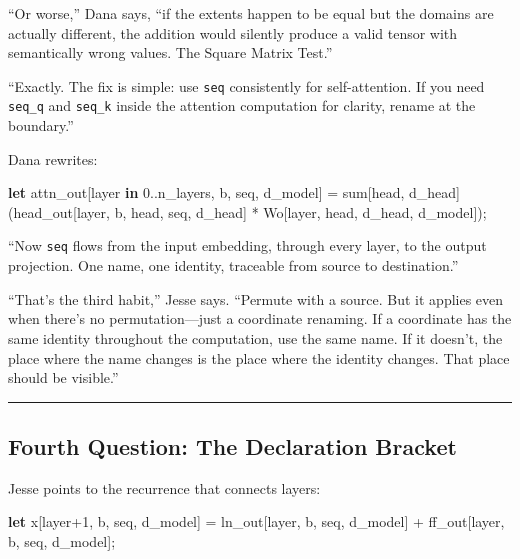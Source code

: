 \documentclass[11pt,]{article}
\newenvironment{Shaded}{}{}
\newcommand{\DecValTok}[1]{\textcolor[rgb]{0.25,0.63,0.44}{#1}}
\newcommand{\KeywordTok}[1]{\textcolor[rgb]{0.00,0.44,0.13}{\textbf{#1}}}
\newcommand{\NormalTok}[1]{#1}
\newcommand{\OperatorTok}[1]{\textcolor[rgb]{0.40,0.40,0.40}{#1}}
\begin{document}
``Or worse,'' Dana says, ``if the extents happen to be equal but the
domains are actually different, the addition would silently produce a
valid tensor with semantically wrong values. The Square Matrix Test.''

``Exactly. The fix is simple: use \texttt{seq} consistently for
self-attention. If you need \texttt{seq\_q} and \texttt{seq\_k} inside
the attention computation for clarity, rename at the boundary.''

Dana rewrites:

\begin{Shaded}
\begin{Highlighting}[]
\KeywordTok{let}\NormalTok{ attn_out}\OperatorTok{[}\NormalTok{layer }\KeywordTok{in} \DecValTok{0.}\NormalTok{.n_layers, b, seq, d_model}\OperatorTok{]}\NormalTok{ =}
\NormalTok{    sum}\OperatorTok{[}\NormalTok{head, d_head}\OperatorTok{]}\NormalTok{(head_out}\OperatorTok{[}\NormalTok{layer, b, head, seq, d_head}\OperatorTok{]}\NormalTok{ *}
\NormalTok{                       Wo}\OperatorTok{[}\NormalTok{layer, head, d_head, d_model}\OperatorTok{]}\NormalTok{);}
\end{Highlighting}
\end{Shaded}

``Now \texttt{seq} flows from the input embedding, through every layer,
to the output projection. One name, one identity, traceable from source
to destination.''

``That's the third habit,'' Jesse says. ``Permute with a source. But it
applies even when there's no permutation---just a coordinate renaming.
If a coordinate has the same identity throughout the computation, use
the same name. If it doesn't, the place where the name changes is the
place where the identity changes. That place should be visible.''

\begin{center}\rule{0.5\linewidth}{0.4pt}\end{center}

\hypertarget{fourth-question-the-declaration-bracket}{%
\subsection{Fourth Question: The Declaration
Bracket}\label{fourth-question-the-declaration-bracket}}

Jesse points to the recurrence that connects layers:

\begin{Shaded}
\begin{Highlighting}[]
\KeywordTok{let}\NormalTok{ x}\OperatorTok{[}\NormalTok{layer+}\DecValTok{1}\NormalTok{, b, seq, d_model}\OperatorTok{]}\NormalTok{ =}
\NormalTok{    ln_out}\OperatorTok{[}\NormalTok{layer, b, seq, d_model}\OperatorTok{]}\NormalTok{ + ff_out}\OperatorTok{[}\NormalTok{layer, b, seq, d_model}\OperatorTok{]}\NormalTok{;}
\end{Highlighting}
\end{Shaded}
\end{document}
